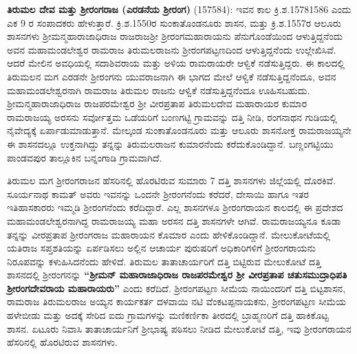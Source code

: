 \textbf{ತಿರುಮಲ ದೇವ ಮತ್ತು ಶ‍್ರೀರಂಗರಾಜ (ಎರಡನೆಯ ಶ‍್ರೀರಂಗ)} (1575\enginline{-}84): ಇವನ ಕಾಲ ಕ್ರಿ.ಶ.1578\enginline{-}1586 ಎಂದು ಎಕ 9 ರ ಸಂಪಾದಕರು ಹೇಳುತ್ತಾರೆ. ಕ್ರಿ.ಶ.1550ರ ಸುಂಕಾತೊಂಡನೂರು ಶಾಸನ, ಮತ್ತು ಕ್ರಿ.ಶ.1557ರ ಆಲೂರು ಶಾಸನಗಳು ಶ‍್ರೀಮನ್ಮಹಾರಾಜಾಧಿರಾಜ ರಾಜರಾಜಶ‍್ರೀ ಶ‍್ರೀರಂಗಮಹಾರಾಯನು ಪೆನುಗೊಂಡೆಯಿಂದ ಆಳುತ್ತಿದ್ದನೆಂದು ಅವನ ಮಹಾಮಂಡಲೇಶ್ವರ ರಾಮರಾಜ ತಿರುಮಲರಾಜನು ಶ‍್ರೀರಂಗಪಟ್ಟಣದಿಂದ ಆಳುತ್ತಿದ್ದನೆಂದು ಉಲ್ಲೇಖಿಸಿವೆ. ಆದರೆ ಮೇಲಿನ ಅವಧಿಯಲ್ಲಿ ಸದಾಶಿವರಾಯ ಮತ್ತು ಅಳಿಯ ರಾಮರಾಯರೇ ಆಳ್ವಿಕೆ ನಡೆಸುತ್ತಿದ್ದರು. ಈ ಕಾಲದಲ್ಲಿ ತಿರುಮಲನ ಮಗ ಎರಡನೇ ಶ‍್ರೀರಂಗನು ಯುವರಾಜನಾಗಿ ಈ ಭಾಗದ ಮೇಲೆ ಆಳ್ವಿಕೆ ನಡೆಸುತ್ತಿದ್ದನೆಂದೂ, ಅವನ ಮಹಾಮಂಡಲೇಶ್ವರನಾಗಿ ರಾಮರಾಜ ತಿರುಮಲ ರಾಜನು ಆಳ್ವಿಕೆ ನಡೆಸುತ್ತಿದ್ದನೆಂದೂ ಊಹಿಸಬಹುದು. ಶ‍್ರೀಮನ್ಮಹಾರಾಜಾಧಿರಾಜ ರಾಜಪರಮೇಶ್ವರ ಶ‍್ರೀ ವೀರಪ್ರತಾಪ ತಿರುಮಲದೇವ ಮಹಾರಾಯರ ಕುಮಾರ ರಾಮರಾಜಯ್ಯ ಅರಸನು ಸರ್ವೋತ್ತಮ ಒಡೆಯರಿಗೆ ಬಂಣಗಟ್ಟಿ ಗ್ರಾಮವನ್ನು ದತ್ತಿ ನೀಡಿ, ರಂಗನಾಥನ ಗುಡಿಯಲ್ಲಿ ನೈವೇದ್ಯಕ್ಕೆ ಏರ್ಪಾಡು\-ಮಾಡುತ್ತಾನೆ. ಮೇಲ್ಕಂಡ ಸುಂಕಾತೊಂಡನೂರು ಮತ್ತು ಆಲೂರು ಶಾಸನೋಕ್ತ ರಾಮರಾಜಯ್ಯನೇ ಈ ಶಾಸನದಲ್ಲೂ ಉಕ್ತನಾಗಿದ್ದು ತನ್ನನ್ನು ತಿರುಮಲರಾಜನ ಕುಮಾರನೆಂದು ಕರೆದುಕೊಂಡಿದ್ದಾನೆ. ಬಣ್ಣಂಗಟ್ಟಿಯು ಪಾಂಡವಪುರ ತಾಲ್ಲೂಕಿನ ಬನ್ನಂಗಾಡಿ ಗ್ರಾಮವಾಗಿದೆ.

ತಿರುಮಲ ಮಗ ಶ‍್ರೀರಂಗರಾಜನ ಹೆಸರಿನಲ್ಲಿ ಹೊರಟಿರುವ ಸುಮಾರು 7 ದತ್ತಿ ಶಾಸನಗಳು ಜಿಲ್ಲೆಯಲ್ಲಿ ದೊರಕಿವೆ. ಸೂರ್ಯನಾಥ ಕಾಮತ್​ ಅವರು ಇವನನ್ನು ಒಂದನೇ ಶ‍್ರೀರಂಗನೆಂದು ಕರೆದರೆ, ದೇಸಾಯಿ ಹಾಗೂ ಇತರ ಇತಿಹಾಸಕಾರರು ಇಮ್ಮಡಿ ಶ‍್ರೀರಂಗನೆಂದು ಕರೆದಿದ್ದಾರೆ. ಎಲ್ಲ ಶಾಸನಗಳೂ ಶ‍್ರೀರಂಗರಾಯನ ಕಾಲದಲ್ಲಿ ಈ ಪ್ರದೇಶದ ಮಹಾಮಂಡಲೇಶ್ವರ\-ನಾಗಿದ್ದ ರಾಮರಾಜಯ್ಯ ಮಹಾ ಅರಸನ ದತ್ತಿ ಶಾಸನಗಳೇ ಆಗಿವೆ. ರಾಮರಾಜಯ್ಯನೂ ಕೂಡಾ ತನ್ನನ್ನು ವೀರಪ್ರತಾಪ ಶ‍್ರೀರಂಗರಾಜ ಮಹಾರಾಯನ ಕೊಮಾರ ಎಂದು ಹೇಳಿಕೊಂಡಿದ್ದಾನೆ. ಮೇಲುಕೋಟೆಯಲ್ಲಿ ಯತಿರಾಜ ಸಪ್ತಶತಿಯನ್ನು ಏರ್ಪಡಿಸಲು ಅಲ್ಲಿನ ಆಚಾರ್ಯ ಪುರುಷರಿಗೆ ಅಧಿಕಾರಿಗಳಿಗೆ ಶ‍್ರೀರಂಗರಾಯನು ನಿರೂಪವನ್ನು ಕಳುಹಿಸಿದನೆಂದು ಹೇಳಿದೆ. ತಿರುಮಲ ತಾತಾಚಾರ್ಯರಿಗೆ ದತ್ತಿ ಬಿಟ್ಟಿರುವ ಮೇಲುಕೋಟೆ ದತ್ತಿ ಶಾಸನದಲ್ಲಿ ಶ‍್ರೀರಂಗನನ್ನು \textbf{“ಶ‍್ರೀಮನ್​ ಮಹಾರಾಜಾಧಿರಾಜ ರಾಜಪರಮೇಶ್ವರ ಶ‍್ರೀ ವೀರಪ್ರತಾಪ ಚತುಸಮುದ್ರಾಧಿಪತಿ ಶ‍್ರೀರಂಗದೇವರಾಯ ಮಹಾರಾಯರು”} ಎಂದು ಕರೆದಿದೆ. ಶ‍್ರೀರಂಗಪಟ್ಟಣ ಸೀಮೆಯ ನಾಯಿಂದರಿಗೆ ದತ್ತಿ ಬಿಟ್ಟಶಾಸನ, ರಾಮರಾಜ ತಿರುಮಲರಾಜ ಅಯ್ಯನ ಕಾರ್ಯಕರ್ತ ದಳವಾಯಿ ನಟಿ ವೆಂಕಟಪ್ಪನಾಯಕನು, ಶ‍್ರೀರಂಗಪಟ್ಟಣ ಸೀಮೆಯ ಹಳೇಬೀಡು ಮತ್ತು ಅದಕ್ಕೆ ಸೇರಿದ ಐದು ಗ್ರಾಮಗಳನ್ನು ಮಣಿಕರ್ಣಿಕಾ ತೀರದಲ್ಲಿ ಬ್ರಾಹ್ಮಣರಿಗೆ ದತ್ತಿ ಹಾಕಿಕೊಟ್ಟ ಶಾಸನ. ಏಟೂರು ನಿವಾಸಿ ತಾತಾಚಾರ್ಯನಿಗೆ ಶ‍್ರೀಭಾಷ್ಯ ಪಠಿಸಲು ನೀಡಿದ ಮೇಲುಕೋಟೆ ದತ್ತಿ, ಇವು ಶ‍್ರೀರಂಗರಾಯನ ಹೆಸರಿನಲ್ಲಿ ಹೊರಟಿರುವ ಶಾಸನಗಳು.

